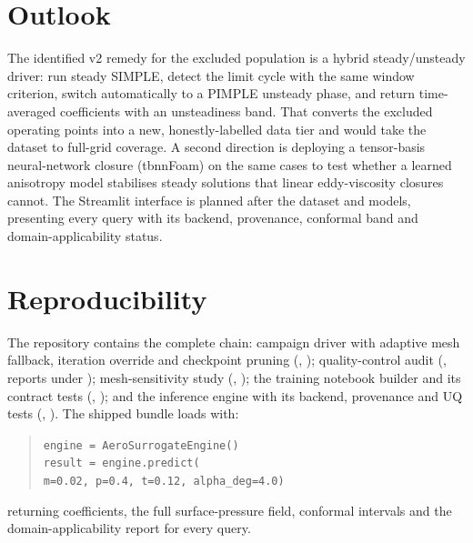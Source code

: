 \documentclass[11pt,a4paper]{article}
\begin{document}
\section{Outlook}

The identified v2 remedy for the excluded population is a hybrid
steady/unsteady driver: run steady SIMPLE, detect the limit cycle with the
same window criterion, switch automatically to a PIMPLE unsteady phase, and
return time-averaged coefficients with an unsteadiness band. That converts
the excluded operating points into a new, honestly-labelled data tier and
would take the dataset to full-grid coverage. A second direction is
deploying a tensor-basis neural-network closure (tbnnFoam) on the same cases
to test whether a learned anisotropy model stabilises steady solutions that
linear eddy-viscosity closures cannot. The Streamlit interface is planned
after the dataset and models, presenting every query with its backend,
provenance, conformal band and domain-applicability status.

\section{Reproducibility}

The repository contains the complete chain: campaign driver with adaptive
mesh fallback, iteration override and checkpoint pruning
(,
);
quality-control audit (, reports under
); mesh-sensitivity study
(, );
the training notebook builder and its contract tests
(,
);
and the inference engine with its backend, provenance and UQ tests
(,
). The shipped bundle loads with:

\begin{quote}
\texttt{engine = AeroSurrogateEngine()}\\
\texttt{result = engine.predict(}\\
\texttt{\hphantom{result = engine.}m=0.02, p=0.4, t=0.12, alpha\_deg=4.0)}
\end{quote}

returning coefficients, the full surface-pressure field, conformal intervals
and the domain-applicability report for every query.
\end{document}
